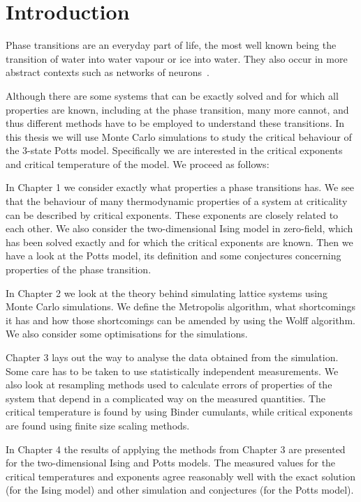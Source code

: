 \documentclass[11pt, a4paper]{report} %
\begin{document}
\tableofcontents

\chapter*{Introduction}
Phase transitions are an everyday part of life, the most well known being the transition of water into water vapour or ice into water.
They also occur in more abstract contexts such as networks of neurons~\cite{tkacik:2015}.

Although there are some systems that can be exactly solved and for which all properties are known, including at the phase transition, many more cannot, and thus different methods have to be employed to understand these transitions.
In this thesis we will use Monte Carlo simulations to study the critical behaviour of the 3-state Potts model.
Specifically we are interested in the critical exponents and critical temperature of the model.
We proceed as follows:

In Chapter 1 we consider exactly what properties a phase transitions has.
We see that the behaviour of many thermodynamic properties of a system at criticality can be described by critical exponents.
These exponents are closely related to each other.
We also consider the two-dimensional Ising model in zero-field, which has been solved exactly and for which the critical exponents are known.
Then we have a look at the Potts model, its definition and some conjectures concerning properties of the phase transition.

In Chapter 2 we look at the theory behind simulating lattice systems using Monte Carlo simulations.
We define the Metropolis algorithm, what shortcomings it has and how those shortcomings can be amended by using the Wolff algorithm.
We also consider some optimisations for the simulations.

Chapter 3 lays out the way to analyse the data obtained from the simulation.
Some care has to be taken to use statistically independent measurements.
We also look at resampling methods used to calculate errors of properties of the system that depend in a complicated way on the measured quantities.
The critical temperature is found by using Binder cumulants, while critical exponents are found using finite size scaling methods.

In Chapter 4 the results of applying the methods from Chapter 3 are presented for the two-dimensional Ising and Potts models.
The measured values for the critical temperatures and exponents agree reasonably well with the exact solution (for the Ising model) and other simulation and conjectures (for the Potts model).
\end{document}
